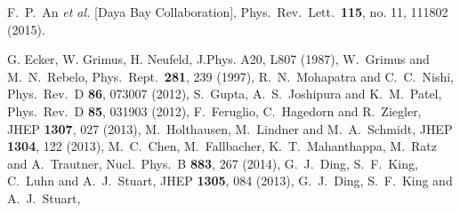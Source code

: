 \documentclass[11pt]{article}
\providecommand{\xlink}[1]
  {\href{http://arxiv.org/abs/#1}{arXiv:#1}}
\begin{document}
\begin{thebibliography}{9}


  F.~P.~An {\it et al.} [Daya Bay Collaboration],
  Phys.\ Rev.\ Lett.\  {\bf 115}, no. 11, 111802 (2015).
  
  
 G. Ecker, W. Grimus, H. Neufeld, J.Phys. A20, L807 (1987),
  W.~Grimus and M.~N.~Rebelo,
  Phys.\ Rept.\  {\bf 281}, 239 (1997),
 R.~N.~Mohapatra and C.~C.~Nishi,
  Phys.\ Rev.\ D {\bf 86}, 073007 (2012),
 S.~Gupta, A.~S.~Joshipura and K.~M.~Patel,
  Phys.\ Rev.\ D {\bf 85}, 031903 (2012),
F.~Feruglio, C.~Hagedorn and R.~Ziegler,
  JHEP {\bf 1307}, 027 (2013),
  M.~Holthausen, M.~Lindner and M.~A.~Schmidt,
  JHEP {\bf 1304}, 122 (2013),
   M.~C.~Chen, M.~Fallbacher, K.~T.~Mahanthappa, M.~Ratz and A.~Trautner,
  Nucl.\ Phys.\ B {\bf 883}, 267 (2014),
    G.~J.~Ding, S.~F.~King, C.~Luhn and A.~J.~Stuart,
  JHEP {\bf 1305}, 084 (2013),
  G.~J.~Ding, S.~F.~King and A.~J.~Stuart,

\end{thebibliography}
\end{document}
